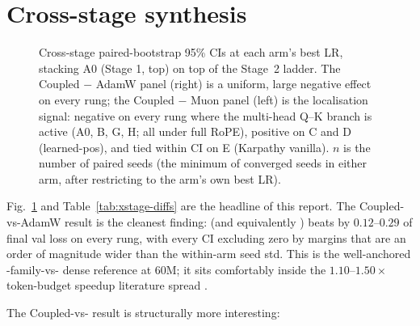 \section{Cross-stage synthesis}\label{sec:synth}

\begin{figure}[h]
\centering
{}
\caption{Cross-stage paired-bootstrap 95\% CIs at each arm's best LR, stacking A0 (Stage 1, top) on top of the Stage~2 ladder. The Coupled $-$ AdamW panel (right) is a uniform, large negative effect on every rung; the Coupled $-$ Muon panel (left) is the localisation signal: negative on every rung where the multi-head Q--K branch is active (A0, B, G, H; all under full RoPE), positive on C and D (learned-pos), and tied within CI on E (Karpathy vanilla). $n$ is the number of paired seeds (the minimum of converged seeds in either arm, after restricting to the arm's own best LR).}\label{fig:xstage-forest}
\end{figure}

\begin{table}[h]
\centering
\caption{Cross-stage paired-bootstrap differences. ``\textbf{*}'' flags CIs bracketing zero. Negative = \optCoupled{} wins.}\label{tab:xstage-diffs}
\end{table}

Fig.~\ref{fig:xstage-forest} and Table~\ref{tab:xstage-diffs} are the headline of this report. The Coupled-vs-AdamW result is the cleanest finding: \optCoupled{} (and equivalently \optMuon{}) beats \optAdamW{} by $0.12$--$0.29$\nats{} of final val loss on every rung, with every CI excluding zero by margins that are an order of magnitude wider than the within-arm seed std. This is the well-anchored \optMuon-family-vs-\optAdamW{} dense reference at 60M; it sits comfortably inside the $1.10$--$1.50\times$ token-budget speedup literature spread \citep{shah2025essential,wen2025fantastic,qiu2025hp}.

The Coupled-vs-\optMuon{} result is structurally more interesting:

